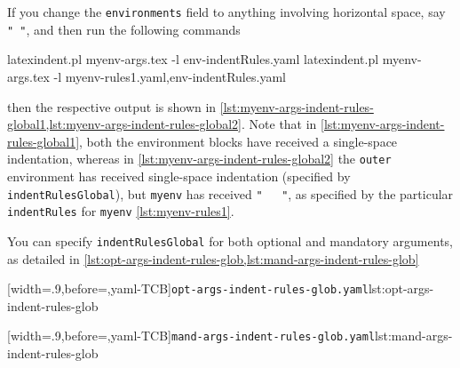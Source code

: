 	If you change the \texttt{environments} field to anything involving horizontal space, say
	\lstinline!" "!, and then run the following commands 

	\begin{commandshell}
latexindent.pl myenv-args.tex -l env-indentRules.yaml
latexindent.pl myenv-args.tex -l myenv-rules1.yaml,env-indentRules.yaml
\end{commandshell}
	then the respective output is shown in
	\cref{lst:myenv-args-indent-rules-global1,lst:myenv-args-indent-rules-global2}. Note that
	in \cref{lst:myenv-args-indent-rules-global1}, both the environment blocks have received
	a single-space indentation, whereas in \cref{lst:myenv-args-indent-rules-global2} the
	\texttt{outer} environment has received single-space indentation (specified by
	\texttt{indentRulesGlobal}), but \texttt{myenv} has received \lstinline!"   "!, as
	specified by the particular \texttt{indentRules} for \texttt{myenv}
	\vref{lst:myenv-rules1}.

	\begin{minipage}{.45\textwidth}
	\end{minipage}
	\hfill
	\begin{minipage}{.45\textwidth}
	\end{minipage}

	You can specify \texttt{indentRulesGlobal} for both optional and mandatory arguments, as
	detailed in \cref{lst:opt-args-indent-rules-glob,lst:mand-args-indent-rules-glob}

	\begin{minipage}{.49\textwidth}
		[width=.9\linewidth,before=\centering,yaml-TCB]{\texttt{opt-args-indent-rules-glob.yaml}}{lst:opt-args-indent-rules-glob}
	\end{minipage}
	\hfill
	\begin{minipage}{.49\textwidth}
		[width=.9\linewidth,before=\centering,yaml-TCB]{\texttt{mand-args-indent-rules-glob.yaml}}{lst:mand-args-indent-rules-glob}
	\end{minipage}

